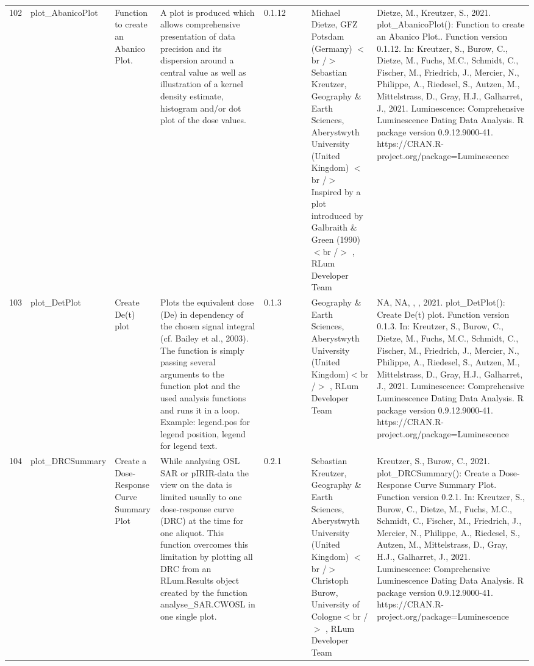 \begin{table}[ht]
\begin{tabular}{rllllllll}
 \\ 
  102 & plot\_AbanicoPlot & Function to create an Abanico Plot. & A plot is produced which allows comprehensive presentation of data precision and its dispersion around a central value as well as illustration of a kernel density estimate, histogram and/or dot plot of the dose values. & 0.1.12
 &  &  & Michael Dietze, GFZ Potsdam (Germany) $<$br /$>$ Sebastian Kreutzer, Geography \& Earth Sciences, Aberystwyth University (United Kingdom) $<$br /$>$ Inspired by a plot introduced by Galbraith \& Green (1990)$<$br /$>$ , RLum Developer Team & Dietze, M., Kreutzer, S., 2021. plot\_AbanicoPlot(): Function to create an Abanico Plot.. Function version 0.1.12. In: Kreutzer, S., Burow, C., Dietze, M., Fuchs, M.C., Schmidt, C., Fischer, M., Friedrich, J., Mercier, N., Philippe, A., Riedesel, S., Autzen, M., Mittelstrass, D., Gray, H.J., Galharret, J., 2021. Luminescence: Comprehensive Luminescence Dating Data Analysis. R package version 0.9.12.9000-41. https://CRAN.R-project.org/package=Luminescence
 \\ 
  103 & plot\_DetPlot & Create De(t) plot & Plots the equivalent dose (De) in dependency of the chosen signal integral (cf. Bailey et al., 2003). The function is simply passing several arguments to the function  plot  and the used analysis functions and runs it in a loop. Example:  legend.pos  for legend position,  legend  for legend text. & 0.1.3
 &  &  & Geography \& Earth Sciences, Aberystwyth University (United Kingdom)$<$br /$>$ , RLum Developer Team & NA, NA, , , 2021. plot\_DetPlot(): Create De(t) plot. Function version 0.1.3. In: Kreutzer, S., Burow, C., Dietze, M., Fuchs, M.C., Schmidt, C., Fischer, M., Friedrich, J., Mercier, N., Philippe, A., Riedesel, S., Autzen, M., Mittelstrass, D., Gray, H.J., Galharret, J., 2021. Luminescence: Comprehensive Luminescence Dating Data Analysis. R package version 0.9.12.9000-41. https://CRAN.R-project.org/package=Luminescence
 \\ 
  104 & plot\_DRCSummary & Create a Dose-Response Curve Summary Plot & While analysing OSL SAR or pIRIR-data the view on the data is limited usually to one dose-response curve (DRC) at the time for one aliquot. This function overcomes this limitation by plotting all DRC from an  RLum.Results  object created by the function  analyse\_SAR.CWOSL  in one single plot. & 0.2.1
 &  &  & Sebastian Kreutzer, Geography \& Earth Sciences, Aberystwyth University (United Kingdom)  $<$br /$>$ Christoph Burow, University of Cologne$<$br /$>$ , RLum Developer Team & Kreutzer, S., Burow, C., 2021. plot\_DRCSummary(): Create a Dose-Response Curve Summary Plot. Function version 0.2.1. In: Kreutzer, S., Burow, C., Dietze, M., Fuchs, M.C., Schmidt, C., Fischer, M., Friedrich, J., Mercier, N., Philippe, A., Riedesel, S., Autzen, M., Mittelstrass, D., Gray, H.J., Galharret, J., 2021. Luminescence: Comprehensive Luminescence Dating Data Analysis. R package version 0.9.12.9000-41. https://CRAN.R-project.org/package=Luminescence

\end{tabular}
\end{table}
